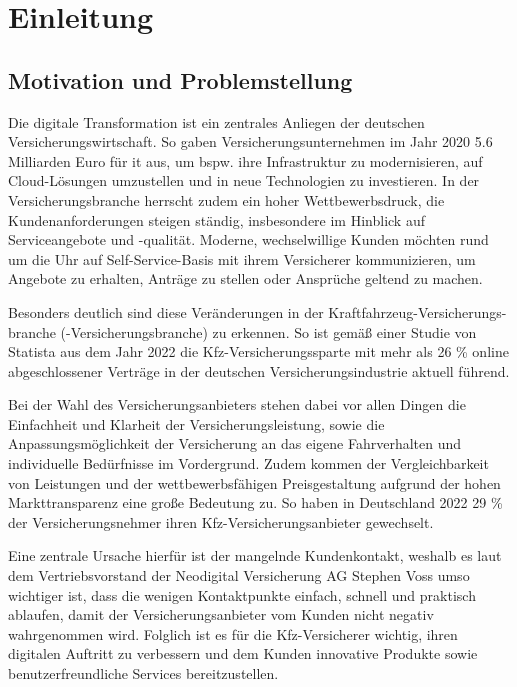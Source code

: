 \chapter{Einleitung}

\section{Motivation und Problemstellung}

Die digitale Transformation ist ein zentrales Anliegen der deutschen Versicherungswirtschaft. So gaben Versicherungsunternehmen im Jahr 2020 5.6 Milliarden Euro für \ac{it} aus, um bspw. ihre Infrastruktur zu modernisieren, auf Cloud-Lösungen umzustellen und in neue Technologien zu investieren. \autocite[Vgl.][S. 2]{PATRIK2023} In der Versicherungsbranche herrscht zudem ein hoher Wettbewerbsdruck, die Kundenanforderungen steigen ständig, insbesondere im Hinblick auf Serviceangebote und -qualität. Moderne, wechselwillige Kunden möchten rund um die Uhr auf Self-Service-Basis mit ihrem Versicherer kommunizieren, um Angebote zu erhalten, Anträge zu stellen oder Ansprüche geltend zu machen. \autocite[Vgl.][]{SCHMIDT2022} 

Besonders deutlich sind diese Veränderungen in der Kraftfahrzeug-Versicherungs-branche (-Versicherungsbranche) zu erkennen. So ist gemäß einer Studie von Statista aus dem Jahr 2022 die Kfz-Versicherungssparte mit mehr als 26 \% online abgeschlossener Verträge in der deutschen Versicherungsindustrie aktuell führend. \autocite[Vgl.][]{STATISTA2023} 

Bei der Wahl des Versicherungsanbieters stehen dabei vor allen Dingen die Einfachheit und Klarheit der Versicherungsleistung, sowie die Anpassungsmöglichkeit der Versicherung an das eigene Fahrverhalten und individuelle Bedürfnisse im Vordergrund. Zudem kommen der Vergleichbarkeit von Leistungen und der wettbewerbsfähigen Preisgestaltung aufgrund der hohen Markttransparenz eine große Bedeutung zu. \autocite[Vgl.][]{MITZNER2023} So haben in Deutschland 2022 29 \% der Versicherungsnehmer ihren Kfz-Versicherungsanbieter gewechselt. \autocite[Vgl.][]{ASSCOMPACTNEWSFURASSEKURANZUNDFINANZWIRTSCHAFT2023} 

Eine zentrale Ursache hierfür ist der mangelnde Kundenkontakt, weshalb es laut dem Vertriebsvorstand der Neodigital Versicherung AG Stephen Voss umso wichtiger ist, dass die wenigen Kontaktpunkte einfach, schnell und praktisch ablaufen, damit der Versicherungsanbieter vom Kunden nicht negativ wahrgenommen wird. Folglich ist es für die Kfz-Versicherer wichtig, ihren digitalen Auftritt zu verbessern und dem Kunden innovative Produkte sowie benutzerfreundliche Services bereitzustellen. \autocite[Vgl.][]{VOSS2022}

